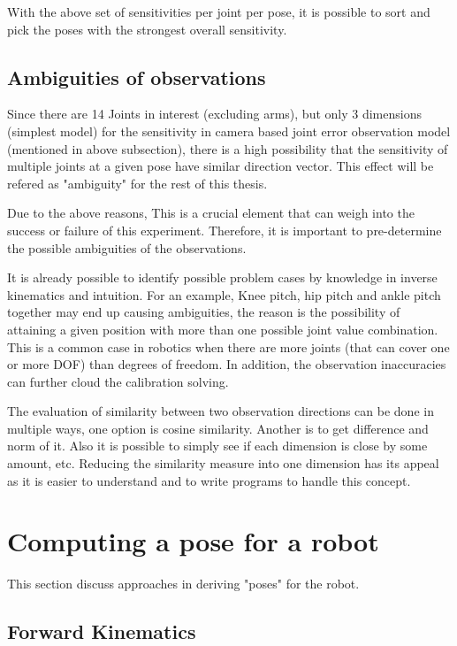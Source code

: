 \documentclass[english, printversion, nomenclature, notitle]{tuvisionthesis} %
\begin{document}
With the above set of sensitivities per joint per pose, it is possible to sort and pick the poses with the strongest overall sensitivity.

\subsection{Ambiguities of observations}

Since there are 14 Joints in interest (excluding arms), but only 3 dimensions (simplest model) for the sensitivity in camera based joint error observation model (mentioned in above subsection), there is a high possibility that the sensitivity of multiple joints at a given pose have similar direction vector. This effect will be refered as "ambiguity" for the rest of this thesis.
 
Due to the above reasons, This is a crucial element that can weigh into the success or failure of this experiment. Therefore, it is important to pre-determine the possible ambiguities of the observations. 

It is already possible to identify possible problem cases by knowledge in inverse kinematics and intuition. For an example, Knee pitch, hip pitch and ankle pitch together may end up causing ambiguities, the reason is the possibility of attaining a given position with more than one possible joint value combination. This is a common case in robotics when there are more joints (that can cover one or more DOF) than degrees of freedom. In addition, the observation inaccuracies can further cloud the calibration solving.

The evaluation of similarity between two observation directions can be done in multiple ways, one option is cosine similarity. Another is to get difference and norm of it. Also it is possible to simply see if each dimension is close by some amount, etc. Reducing the similarity measure into one dimension has its appeal as it is easier to understand and to write programs to handle this concept.


\section{Computing a pose for a robot}
This section discuss approaches in deriving "poses" for the robot.
\subsection{Forward Kinematics}
\end{document}
